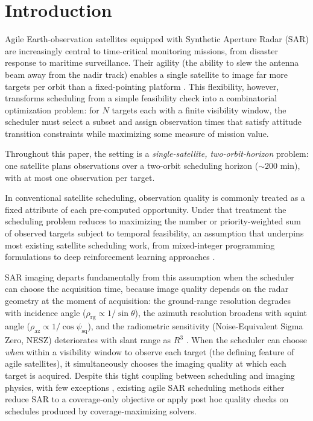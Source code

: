 \documentclass[preprint,12pt,authoryear]{elsarticle}
\begin{document}
\section{Introduction}
\label{sec:introduction}
Agile Earth-observation satellites equipped with Synthetic Aperture Radar (SAR)
are increasingly central to time-critical monitoring missions, from disaster response
to maritime surveillance.
Their agility (the ability to slew the antenna beam away from the nadir track)
enables a single satellite to image far more targets per orbit than a fixed-pointing
platform \citep{Curlander1991}.
This flexibility, however, transforms scheduling from a simple feasibility check
into a combinatorial optimization problem: for $N$ targets each with a finite
visibility window, the scheduler must select a subset and assign observation times
that satisfy attitude transition constraints while maximizing some measure of
mission value.

Throughout this paper, the setting is a \emph{single-satellite, two-orbit-horizon} problem: one
satellite plans observations over a two-orbit scheduling horizon ($\sim 200$ min), with at most
one observation per target.

In conventional satellite scheduling, observation quality is commonly
treated as a fixed attribute of each pre-computed opportunity. Under that
treatment the scheduling problem reduces to maximizing the number or
priority-weighted sum of observed targets subject to temporal feasibility, an
assumption that underpins most existing satellite scheduling work, from
mixed-integer programming formulations to deep reinforcement learning
approaches \citep{Chen2025NeuralPriority}.

SAR imaging departs fundamentally from this assumption when the scheduler can choose the acquisition time, because image quality depends on the radar geometry at the moment of acquisition:
the ground-range resolution degrades with incidence angle ($\rho_{\text{rg}} \propto 1/\sin\theta$),
the azimuth resolution broadens with squint angle ($\rho_{\text{az}} \propto 1/\cos\psi_{\text{sq}}$),
and the radiometric sensitivity (Noise-Equivalent Sigma Zero, NESZ) deteriorates
with slant range as $R^3$ \citep{Cumming2005}.
When the scheduler can choose \emph{when} within a visibility window to observe
each target (the defining feature of agile satellites), it simultaneously
chooses the imaging quality at which each target is acquired.
Despite this tight coupling between scheduling and imaging physics,
with few exceptions \citep{Kramer2025SARVis}, existing
agile SAR scheduling methods either reduce SAR to a coverage-only objective
or apply post hoc quality checks on schedules produced by
coverage-maximizing solvers.
\end{document}
